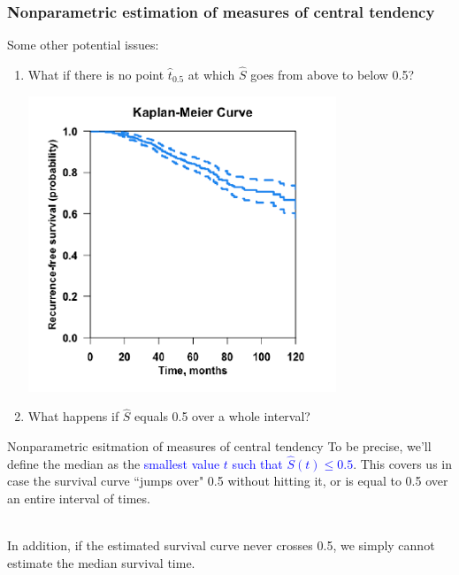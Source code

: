 \documentclass[10pt,t]{beamer}
\begin{document}
\begin{frame}
\frametitle{Nonparametric estimation of measures of central tendency}
Some other potential issues: 
\begin{enumerate}
\item What if there is no point $\hat{t}_{0.5}$ at which $\widehat{S}$ goes from above to below 0.5?
\begin{center}
	\includegraphics[width=0.6\textheight]{figs/no_median.png}
\end{center}
\item What happens if $\widehat{S}$ equals 0.5 over a whole interval?
\end{enumerate}

\end{frame}


\begin{frame}{Nonparametric esitmation of measures of central tendency}
	To be precise, we'll define the median as the \textcolor{blue}{smallest value $t$ such that $\widehat{S}(t) \leq 0.5$}. This covers us in case the survival curve ``jumps over" 0.5 without hitting it, or is equal to 0.5 over an entire interval of times. 
	\\ ~\ 
	
	In addition, if the estimated survival curve never crosses 0.5, we simply cannot estimate the median survival time. 
\end{frame}
\end{document}
